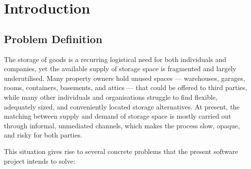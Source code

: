 \documentclass[11pt,a4paper,oneside]{report}
\begin{document}
\chapter{Introduction}

\section{Problem Definition}

The storage of goods is a recurring logistical need for both individuals and companies, yet the available supply of storage space is fragmented and largely underutilised. Many property owners hold unused spaces --- warehouses, garages, rooms, containers, basements, and attics --- that could be offered to third parties, while many other individuals and organisations struggle to find flexible, adequately sized, and conveniently located storage alternatives. At present, the matching between supply and demand of storage space is mostly carried out through informal, unmediated channels, which makes the process slow, opaque, and risky for both parties.

This situation gives rise to several concrete problems that the present software project intends to solve:
\end{document}
